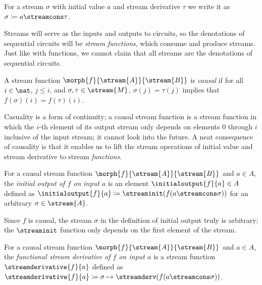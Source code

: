 \begin{notation}
    For a stream \(\sigma\) with initial value \(a\) and stream derivative
    \(\tau\) we write it as \(\sigma \coloneqq a \streamcons \tau\).
\end{notation}

Streams will serve as the inputs and outputs to circuits, so the denotations of
sequential circuits will be \emph{stream functions}, which consume and produce
streams.
Just like with functions, we cannot claim that all streams are the
denotations of sequential circuits.

\begin{definition}
    A stream function \(\morph{f}{\stream{A}}{\stream{B}}\) is \emph{causal} if
    for all \(i \in \nat\), \(j \leq i\), and \(\sigma,\tau \in \stream{M}\),
    \(\sigma(j) = \tau(j)\) implies that \(f(\sigma)(i) = f(\tau)(i)\).
\end{definition}

Casuality is a form of continuity; a causal stream function is a stream function
in which the \(i\)-th element of its output stream only depends on elements
\(0\) through \(i\) inclusive of the input stream; it cannot look into the
future.
A neat consequence of causality is that it enables us to lift the stream
operations of initial value and stream derivative to stream \emph{functions}.

\begin{definition}
    For a causal stream function \(\morph{f}{\stream{A}}{\stream{B}}\) and
    \(a \in A\), the \emph{initial output of \(f\) on input \(a\)} is an element
    \(\initialoutput{f}{a} \in A\) defined as
    \(\initialoutput{f}{a} \coloneqq \streaminit(f(a \streamcons \sigma))\) for
    an arbitrary \(\sigma \in \stream{A}\).
\end{definition}

Since \(f\) is causal, the stream \(\sigma\) in the definition of initial
output truly is arbitrary; the \(\streaminit\) function only depends on the
first element of the stream.

\begin{definition}
    For a causal stream function \(\morph{f}{\stream{A}}{\stream{B}}\) and
    \(a \in A\), the
    \emph{functional stream derivative of \(f\) on input \(a\)} is a stream
    function \(\streamderivative{f}{a}\) defined as \(
    \streamderivative{f}{a}
    \coloneqq
    \sigma \mapsto \streamderv(f(a \streamcons \sigma))
    \).
\end{definition}

